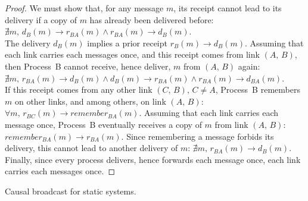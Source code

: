 \begin{proof}
  We must show that, for any message $m$, its receipt cannot lead to its
  delivery if a copy of $m$ has already been delivered before:
  $\nexists m,\, d_B(m) \rightarrow r_{BA}(m) \wedge r_{BA}(m) \rightarrow
  d_B(m)$.\\
  The delivery $d_B(m)$ implies a prior receipt $r_B(m) \rightarrow d_B(m)$.
  Assuming that each link carries each messages once, and this receipt comes
  from link $(A,\, B)$, then Process~B cannot receive, hence deliver, $m$ from
  $(A,\, B)$ again:
  $\nexists m,\, r_{BA}(m) \rightarrow d_B(m) \wedge d_B(m) \rightarrow
  r_{BA}(m) \wedge r_{BA}(m) \rightarrow d_{BA}(m)$.\\
  If this receipt comes from any other link $(C,\, B),\, C\neq A$, Process~B
  remembers $m$ on other links, and among others, on link $(A,\, B)$:
  $\forall m,\, r_{BC}(m) \rightarrow remember_{BA}(m)$. Assuming that each link
  carries each message once, Process~B eventually receives a copy of $m$ from
  link $(A,\,B)$: $remember_{BA}(m) \rightarrow r_{BA}(m)$. Since remembering a
  message forbids its delivery, this cannot lead to another
  delivery of $m$: $\nexists m,\, r_{BA}(m) \rightarrow d_{B}(m)$.\\
  Finally, since every process delivers, hence forwards each message once, each
  link carries each messages once.
\end{proof}


\begin{algorithm}[h]
  
  \caption{\label{algo:reliablebroadcast}Causal broadcast for static systems.}
\end{algorithm}

